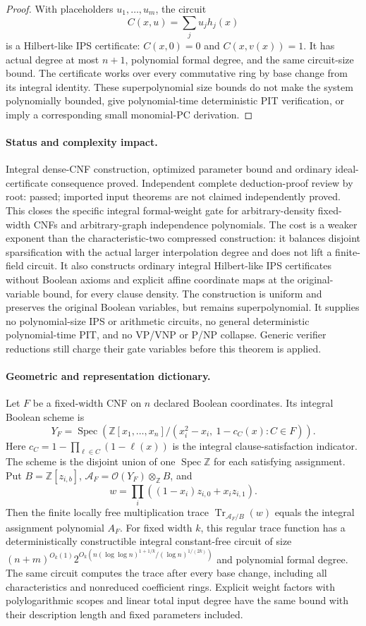 \begin{proof}
With placeholders $u_1,\ldots,u_m$, the circuit
\[
                    C(x,u)=\sum_j u_jh_j(x)
\]
is a Hilbert-like IPS certificate: $C(x,0)=0$ and
$C(x,v(x))=1$.  It has actual degree at most $n+1$,
polynomial formal degree, and the same circuit-size bound.
The certificate works over every commutative ring by base
change from its integral identity.  These superpolynomial
size bounds do not make the system polynomially bounded,
give polynomial-time deterministic PIT verification, or
imply a corresponding small monomial-PC derivation.
\end{proof}
\paragraph{Status and complexity impact.}
Integral dense-CNF construction, optimized parameter bound and ordinary ideal-certificate consequence proved. Independent complete deduction-proof review by root: passed; imported input theorems are not claimed independently proved. This closes the specific integral formal-weight gate for arbitrary-density fixed-width CNFs and arbitrary-graph independence polynomials. The cost is a weaker exponent than the characteristic-two compressed construction: it balances disjoint sparsification with the actual larger interpolation degree and does not lift a finite-field circuit. It also constructs ordinary integral Hilbert-like IPS certificates without Boolean axioms and explicit affine coordinate maps at the original-variable bound, for every clause density. The construction is uniform and preserves the original Boolean variables, but remains superpolynomial. It supplies no polynomial-size IPS or arithmetic circuits, no general deterministic polynomial-time PIT, and no VP/VNP or P/NP collapse. Generic verifier reductions still charge their gate variables before this theorem is applied.

\paragraph{Geometric and representation dictionary.}
Let $F$ be a fixed-width CNF on $n$ declared Boolean coordinates. Its integral Boolean scheme is
\[
 Y_F=\operatorname{Spec}\!\left(
 \mathbb Z[x_1,\ldots,x_n]/(x_i^2-x_i,\ 1-c_C(x):C\in F)\right).
\]
Here $c_C=1-\prod_{\ell\in C}(1-\ell(x))$ is the integral clause-satisfaction indicator. The scheme is the disjoint union of one $\operatorname{Spec}\mathbb Z$ for each satisfying assignment. Put $B=\mathbb Z[z_{i,b}]$, $\mathscr A_F=\mathcal O(Y_F)\otimes_{\mathbb Z}B$, and
\[
                         w=\prod_i((1-x_i)z_{i,0}+x_i z_{i,1}).
\]
Then the finite locally free multiplication trace $\operatorname{Tr}_{\mathscr A_F/B}(w)$ equals the integral assignment polynomial $A_F$. For fixed width $k$, this regular trace function has a deterministically constructible integral constant-free circuit of size $(n+m)^{O_k(1)}2^{O_k(n(\log\log n)^{1+1/k}/(\log n)^{1/(2k)})}$ and polynomial formal degree. The same circuit computes the trace after every base change, including all characteristics and nonreduced coefficient rings. Explicit weight factors with polylogarithmic scopes and linear total input degree have the same bound with their description length and fixed parameters included.

